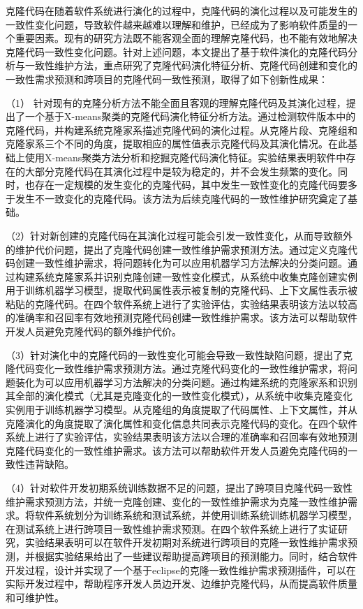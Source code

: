 

克隆代码在随着软件系统进行演化的过程中，克隆代码的演化过程以及可能发生的一致性变化问题，导致软件越来越难以理解和维护，已经成为了影响软件质量的一个重要因素。现有的研究方法既不能客观全面的理解克隆代码，也不能有效地解决克隆代码一致性变化问题。针对上述问题，本文提出了基于软件演化的克隆代码分析与一致性维护方法，重点研究了克隆代码演化特征分析、克隆代码创建和变化的一致性需求预测和跨项目的克隆代码一致性预测，取得了如下创新性成果：

（1） 针对现有的克隆分析方法不能全面且客观的理解克隆代码及其演化过程，提出了一个基于X-means聚类的克隆代码演化特征分析方法。通过检测软件版本中的克隆代码，并构建系统克隆家系描述克隆代码的演化过程。从克隆片段、克隆组和克隆家系三个不同的角度，提取相应的属性值表示克隆代码及其演化情况。在此基础上使用X-means聚类方法分析和挖掘克隆代码演化特征。实验结果表明软件中存在的大部分克隆代码在其演化过程中是较为稳定的，并不会发生频繁的变化。同时，也存在一定规模的发生变化的克隆代码，其中发生一致性变化的克隆代码要多于发生不一致变化的克隆代码。该方法为后续克隆代码的一致性维护研究奠定了基础。

（2）针对新创建的克隆代码在其演化过程可能会引发一致性变化，从而导致额外的维护代价问题，提出了克隆代码创建一致性维护需求预测方法。通过定义克隆代码创建一致性维护需求，将问题转化为可以应用机器学习方法解决的分类问题。通过构建系统克隆家系并识别克隆创建一致性变化模式，从系统中收集克隆创建实例用于训练机器学习模型，提取代码属性表示被复制的克隆代码、上下文属性表示被粘贴的克隆代码。在四个软件系统上进行了实验评估，实验结果表明该方法以较高的准确率和召回率有效地预测克隆代码创建一致性维护需求。该方法可以帮助软件开发人员避免克隆代码的额外维护代价。

（3）针对演化中的克隆代码的一致性变化可能会导致一致性缺陷问题，提出了克隆代码变化一致性维护需求预测方法。通过克隆代码变化的一致性维护需求，将问题装化为可以应用机器学习方法解决的分类问题。通过构建系统的克隆家系和识别其全部的演化模式（尤其是克隆变化的一致性变化模式），从系统中收集克隆变化实例用于训练机器学习模型。从克隆组的角度提取了代码属性、上下文属性，并从克隆演化的角度提取了演化属性和变化信息共同表示克隆代码的变化。在四个软件系统上进行了实验评估，实验结果表明该方法以合理的准确率和召回率有效地预测克隆代码变化的一致性维护需求。该方法可以帮助软件开发人员避免克隆代码的一致性违背缺陷。

（4）针对软件开发初期系统训练数据不足的问题，提出了跨项目克隆代码一致性维护需求预测方法，并统一克隆创建、变化的一致性维护需求为克隆一致性维护需求。将软件系统划分为训练系统和测试系统，并使用训练系统训练机器学习模型，在测试系统上进行跨项目一致性维护需求预测。在四个软件系统上进行了实证研究，实验结果表明可以在软件开发初期对系统进行跨项目的克隆一致性维护需求预测，并根据实验结果给出了一些建议帮助提高跨项目的预测能力。同时，结合软件开发过程，设计并实现了一个基于eclipse的克隆一致性维护需求预测插件，可以在实际开发过程中，帮助程序开发人员边开发、边维护克隆代码，从而提高软件质量和可维护性。

